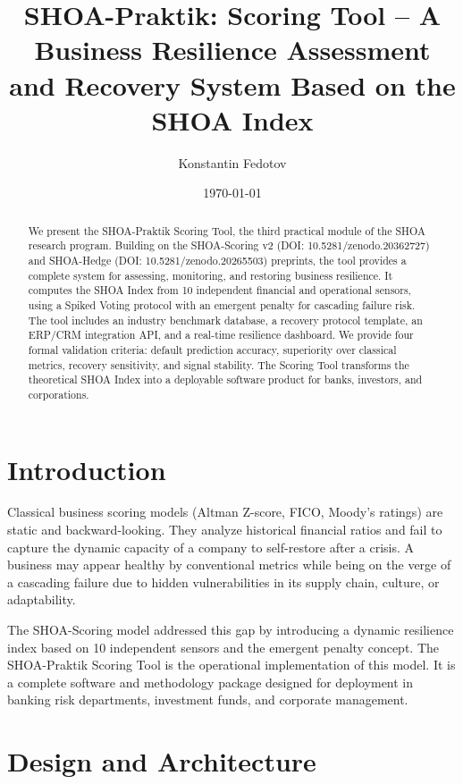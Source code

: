 \documentclass[12pt]{article}
\title{SHOA-Praktik: Scoring Tool -- A Business Resilience Assessment and Recovery System Based on the SHOA Index}
\author{Konstantin Fedotov}
\date{\today}
\begin{document}
\maketitle

\begin{abstract}
We present the SHOA-Praktik Scoring Tool, the third practical module of the SHOA research program. Building on the SHOA-Scoring v2 (DOI: 10.5281/zenodo.20362727) and SHOA-Hedge (DOI: 10.5281/zenodo.20265503) preprints, the tool provides a complete system for assessing, monitoring, and restoring business resilience. It computes the SHOA Index from 10 independent financial and operational sensors, using a Spiked Voting protocol with an emergent penalty for cascading failure risk. The tool includes an industry benchmark database, a recovery protocol template, an ERP/CRM integration API, and a real-time resilience dashboard. We provide four formal validation criteria: default prediction accuracy, superiority over classical metrics, recovery sensitivity, and signal stability. The Scoring Tool transforms the theoretical SHOA Index into a deployable software product for banks, investors, and corporations.
\end{abstract}

\section{Introduction}
Classical business scoring models (Altman Z-score, FICO, Moody's ratings) are static and backward-looking. They analyze historical financial ratios and fail to capture the dynamic capacity of a company to self-restore after a crisis. A business may appear healthy by conventional metrics while being on the verge of a cascading failure due to hidden vulnerabilities in its supply chain, culture, or adaptability.

The SHOA-Scoring model addressed this gap by introducing a dynamic resilience index based on 10 independent sensors and the emergent penalty concept. The SHOA-Praktik Scoring Tool is the operational implementation of this model. It is a complete software and methodology package designed for deployment in banking risk departments, investment funds, and corporate management.

\section{Design and Architecture}
\end{document}
